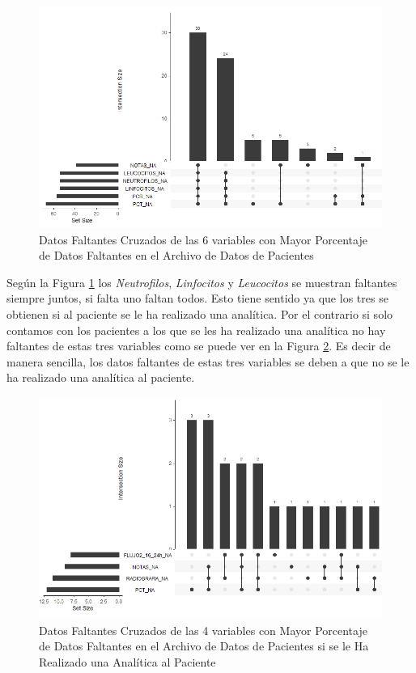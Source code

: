 \begin{figure}[H]
    \centering
    \includegraphics[scale = 0.70]{./img/missig-data-descriptive-cross.png}
    \caption{Datos Faltantes Cruzados de las 6 variables con Mayor Porcentaje de Datos Faltantes en el Archivo de Datos de Pacientes}
    \label{fig:missing-descriptive-cross}
\end{figure}

Según la Figura \ref{fig:missing-descriptive-cross} los \textit{Neutrofilos}, \textit{Linfocitos} y \textit{Leucocitos} se muestran faltantes siempre juntos, si falta uno faltan todos. Esto tiene sentido ya que los tres se obtienen si al paciente se le ha realizado una analítica. Por el contrario si solo contamos con los pacientes a los que se les ha realizado una analítica no hay faltantes de estas tres variables como se puede ver en la Figura \ref{fig:missing-descriptive-cross-analitica}. Es decir de manera sencilla, los datos faltantes de estas tres variables se deben a que no se le ha realizado una analítica al paciente.

\begin{figure}[H]
    \centering
    \includegraphics[scale = 0.70]{./img/missig-data-descriptive-cross-anal.png}
    \caption{Datos Faltantes Cruzados de las 4 variables con Mayor Porcentaje de Datos Faltantes en el Archivo de Datos de Pacientes si se le Ha Realizado una Analítica al Paciente}
    \label{fig:missing-descriptive-cross-analitica}
\end{figure}
\newpage


